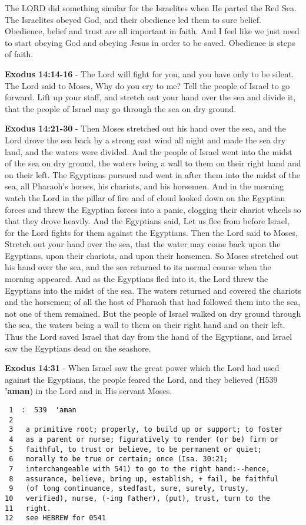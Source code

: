 \documentclass[11pt]{article}
\begin{document}
The LORD did something similar for the Israelites when He parted the Red Sea.
The Israelites obeyed God, and their obedience led them to sure belief.
Obedience, belief and trust are all important in faith.
And I feel like we just need to start obeying God and obeying Jesus in order to be saved. Obedience is steps of faith.

\textbf{Exodus 14:14-16} - The Lord will fight for you, and you have only to be silent.  The Lord said to Moses, Why do you cry to me? Tell the people of Israel to go forward.  Lift up your staff, and stretch out your hand over the sea and divide it, that the people of Israel may go through the sea on dry ground.

\textbf{Exodus 14:21-30} - Then Moses stretched out his hand over the sea, and the Lord drove the sea back by a strong east wind all night and made the sea dry land, and the waters were divided. And the people of Israel went into the midst of the sea on dry ground, the waters being a wall to them on their right hand and on their left. The Egyptians pursued and went in after them into the midst of the sea, all Pharaoh's horses, his chariots, and his horsemen. And in the morning watch the Lord in the pillar of fire and of cloud looked down on the Egyptian forces and threw the Egyptian forces into a panic, clogging their chariot wheels so that they drove heavily. And the Egyptians said, Let us flee from before Israel, for the Lord fights for them against the Egyptians. Then the Lord said to Moses, Stretch out your hand over the sea, that the water may come back upon the Egyptians, upon their chariots, and upon their horsemen. So Moses stretched out his hand over the sea, and the sea returned to its normal course when the morning appeared. And as the Egyptians fled into it, the Lord threw the Egyptians into the midst of the sea. The waters returned and covered the chariots and the horsemen; of all the host of Pharaoh that had followed them into the sea, not one of them remained. But the people of Israel walked on dry ground through the sea, the waters being a wall to them on their right hand and on their left. Thus the Lord saved Israel that day from the hand of the Egyptians, and Israel saw the Egyptians dead on the seashore.

\textbf{Exodus 14:31} - When Israel saw the great power which the Lord had used against the Egyptians, the people feared the Lord, and they believed (H539 \textbf{'aman}) in the Lord and in His servant Moses.

\begin{verbatim}
 1  :  539  'aman
 2  
 3   a primitive root; properly, to build up or support; to foster
 4   as a parent or nurse; figuratively to render (or be) firm or
 5   faithful, to trust or believe, to be permanent or quiet;
 6   morally to be true or certain; once (Isa. 30:21;
 7   interchangeable with 541) to go to the right hand:--hence,
 8   assurance, believe, bring up, establish, + fail, be faithful
 9   (of long continuance, stedfast, sure, surely, trusty,
10   verified), nurse, (-ing father), (put), trust, turn to the
11   right.
12   see HEBREW for 0541
\end{verbatim}
\end{document}
